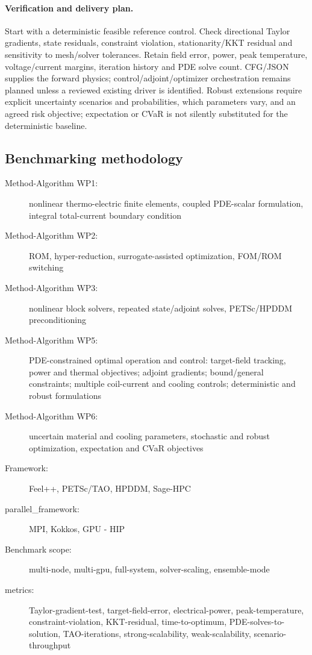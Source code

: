 \paragraph{Verification and delivery plan.}
Start with a deterministic feasible reference control. Check directional
Taylor gradients, state residuals, constraint violation, stationarity/KKT
residual and sensitivity to mesh/solver tolerances. Retain field error,
power, peak temperature, voltage/current margins, iteration history and PDE
solve count. CFG/JSON supplies the forward physics; control/adjoint/optimizer
orchestration remains planned unless a reviewed existing driver is identified.
Robust extensions require explicit uncertainty scenarios and probabilities,
which parameters vary, and an agreed risk objective; expectation or CVaR is
not silently substituted for the deterministic baseline.

\subsection{Benchmarking methodology}


\begin{description}
  \item[Method-Algorithm WP1:] nonlinear thermo-electric finite elements, coupled PDE-scalar formulation, integral total-current boundary condition
  \item[Method-Algorithm WP2:] ROM, hyper-reduction, surrogate-assisted optimization, FOM/ROM switching
  \item[Method-Algorithm WP3:] nonlinear block solvers, repeated state/adjoint solves, PETSc/HPDDM preconditioning
  \item[Method-Algorithm WP5:] PDE-constrained optimal operation and control: target-field tracking, power and thermal objectives; adjoint gradients; bound/general constraints; multiple coil-current and cooling controls; deterministic and robust formulations
  \item[Method-Algorithm WP6:] uncertain material and cooling parameters, stochastic and robust optimization, expectation and CVaR objectives
  \item[Framework:] Feel++, PETSc/TAO, HPDDM, Sage-HPC
  \item[parallel\_framework:] MPI, Kokkos, GPU - HIP
  \item[Benchmark scope:] multi-node, multi-gpu, full-system, solver-scaling, ensemble-mode
  \item[metrics:] Taylor-gradient-test, target-field-error, electrical-power, peak-temperature, constraint-violation, KKT-residual, time-to-optimum, PDE-solves-to-solution, TAO-iterations, strong-scalability, weak-scalability, scenario-throughput
\end{description}
